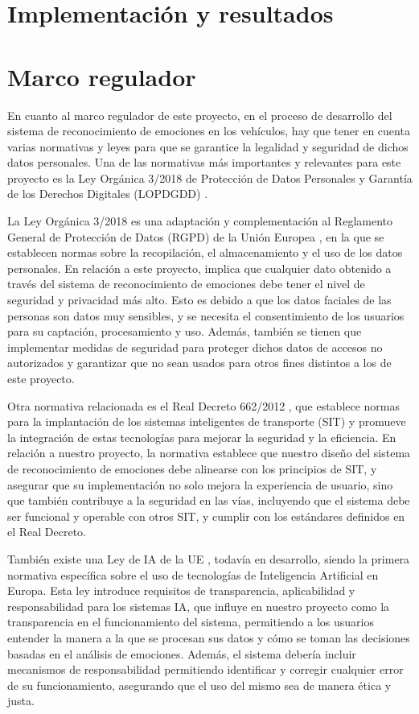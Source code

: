 \documentclass[12pt]{report} %
\begin{document}
\chapter{Implementación y resultados}



\chapter{Marco regulador}

En cuanto al marco regulador de este proyecto, en el proceso de desarrollo del sistema de reconocimiento de emociones en los vehículos, hay que tener en cuenta varias normativas y leyes para que se garantice la legalidad y seguridad de dichos datos personales. Una de las normativas más importantes y relevantes para este proyecto es la Ley Orgánica 3/2018 de Protección de Datos Personales y Garantía de los Derechos Digitales (LOPDGDD) 
\cite{lopd-gdd}.

La Ley Orgánica 3/2018 es una adaptación y complementación al Reglamento General de Protección de Datos (RGPD) de la Unión Europea \cite{rgpd}, en la que se establecen normas sobre la recopilación, el almacenamiento y el uso de los datos personales. En relación a este proyecto, implica que cualquier dato obtenido a través del sistema de reconocimiento de emociones debe tener el nivel de seguridad y privacidad más alto. Esto es debido a que los datos faciales de las personas son datos muy sensibles, y se necesita el consentimiento de los usuarios para su captación, procesamiento y uso. Además, también se tienen que implementar medidas de seguridad para proteger dichos datos de accesos no autorizados y garantizar que no sean usados para otros fines distintos a los de este proyecto. 

Otra normativa relacionada es el Real Decreto 662/2012 \cite{rd-sit}, que establece normas para la implantación de los sistemas inteligentes de transporte (SIT) y promueve la integración de estas tecnologías para mejorar la seguridad y la eficiencia. En relación a nuestro proyecto, la normativa establece que nuestro diseño del sistema de reconocimiento de emociones debe alinearse con los principios de SIT, y asegurar que su implementación no solo mejora la experiencia de usuario, sino que también contribuye a la seguridad en las vías, incluyendo que el sistema debe ser funcional y operable con otros SIT, y cumplir con los estándares definidos en el Real Decreto. 

También existe una Ley de IA de la UE \cite{normativaIA}, todavía en desarrollo, siendo la primera normativa específica sobre el uso de tecnologías de Inteligencia Artificial en Europa. Esta ley introduce requisitos de transparencia, aplicabilidad y responsabilidad para los sistemas IA, que influye en nuestro proyecto como la transparencia en el funcionamiento del sistema, permitiendo a los usuarios entender la manera a la que se procesan sus datos y cómo se toman las decisiones basadas en el análisis de emociones. Además, el sistema debería incluir mecanismos de responsabilidad permitiendo identificar y corregir cualquier error de su funcionamiento, asegurando que el uso del mismo sea de manera ética y justa. 
\end{document}
